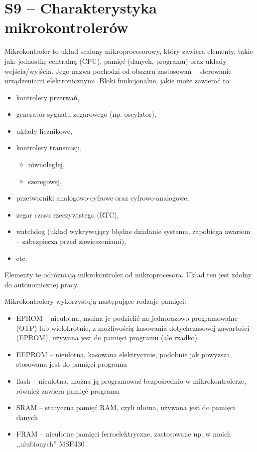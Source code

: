 \section{S9 -- Charakterystyka mikrokontrolerów}

Mikrokontroler to układ scalony mikroprocesorowy, który zawiera elementy, takie jak: jednostkę centralną (CPU), pamięć (danych, programu) oraz układy wejścia/wyjścia. Jego nazwa pochodzi od obszaru zastosowań -- sterowanie urządzeniami elektronicznymi. Bloki funkcjonalne, jakie może zawierać to: 
\begin{itemize}
\item kontrolery przerwań,
\item generator sygnału zegarowego (np. oscylator),
\item układy licznikowe,
\item kontrolery transmisji,
\begin{itemize}
\item równoległej,
\item szeregowej,
\end{itemize}
\item przetworniki analogowo-cyfrowe oraz cyfrowo-analogowe,
\item zegar czasu rzeczywistego (RTC),
\item watchdog (układ wykrywający błędne działanie systemu, zapobiega awariom -- zabezpiecza przed zawieszeniami),
\item etc.
\end{itemize}
Elementy te odróżniają mikrokontroler od mikroprocesora. Układ ten jest zdolny do autonomicznej pracy.

Mikrokontrolery wykorzystują następujące rodzaje pamięci:
\begin{itemize}
\item EPROM -- nieulotna, można je podzielić na jednorazowo programowalne (OTP) lub wielokrotnie, z możliwością kasowania dotychczasowej zawartości (EPROM), używana jest do pamięci programu (ale rzadko)
\item EEPROM -- nieulotna, kasowana elektrycznie, podobnie jak powyższa, stosowana jest do pamięci programu
\item flash -- nieulotna, można ją programować bezpośrednio w mikrokontrolerze, również zawiera pamięć programu
\item SRAM -- statyczna pamięć RAM, czyli ulotna, używana jest do pamięci danych
\item FRAM -- nieulotne pamięci ferroelektryczne, zastosowane np. w moich ,,ulubionych'' MSP430
\end{itemize}

